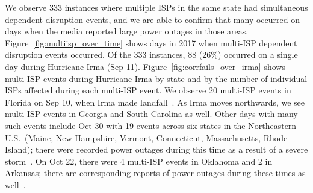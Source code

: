 We observe 333 instances where multiple ISPs in the same state had simultaneous dependent
disruption events, and we are able to
confirm that many occurred on days when the media reported large power
outages in those areas. Figure~\ref{fig:multiisp_over_time} shows days
in 2017 when multi-ISP dependent disruption events occurred. Of the
333 instances, 88 (26\%)
occurred on a single day during Hurricane Irma (Sep 11). Figure~\ref{fig:corrfails_over_irma} shows
multi-ISP events during Hurricane Irma by state and by the number of individual ISPs
affected during each multi-ISP event. We observe 20 multi-ISP events
in Florida on Sep 10, when Irma made landfall~\cite{irma-noaa}. As Irma moves northwards, we see
multi-ISP events in Georgia and South Carolina as well. Other days with
many such events include Oct 30 with 19 events across six
states in the Northeastern U.S.~(Maine, New Hampshire, Vermont,
Connecticut, Massachusetts, Rhode Island); there were recorded power
outages during this time as a result of a severe
storm~\cite{oct-30-2017-northeast-bombogenesis-weathercom,
  oct-30-2017-northeast-bombogenesis-nws, oct-30-2017-northeast-bombogenesis-wapo}. On Oct 22,
there were 4 multi-ISP events in Oklahoma and 2 in Arkansas; there are
corresponding reports
of power outages during these times as
well~\cite{oct-22-2017-okar-tornado-newson6}.
